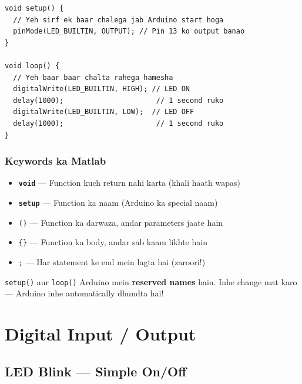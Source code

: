 \documentclass[12pt,a4paper]{article}
\newcommand{\keyword}[1]{\textcolor{keywordColor}{\texttt{\textbf{#1}}}}
\begin{document}
\begin{tcolorbox}[codebox=Ek Basic Arduino Program]
\begin{lstlisting}
void setup() {
  // Yeh sirf ek baar chalega jab Arduino start hoga
  pinMode(LED_BUILTIN, OUTPUT); // Pin 13 ko output banao
}

void loop() {
  // Yeh baar baar chalta rahega hamesha
  digitalWrite(LED_BUILTIN, HIGH); // LED ON
  delay(1000);                      // 1 second ruko
  digitalWrite(LED_BUILTIN, LOW);  // LED OFF
  delay(1000);                      // 1 second ruko
}
\end{lstlisting}
\end{tcolorbox}

\subsubsection{Keywords ka Matlab}

\begin{itemize}[leftmargin=*]
  \item \keyword{void} — Function kuch return nahi karta (khali haath wapas)
  \item \keyword{setup} — Function ka naam (Arduino ka special naam)
  \item \texttt{()} — Function ka darwaza, andar parameters jaate hain
  \item \texttt{\{\}} — Function ka body, andar sab kaam likhte hain
  \item \texttt{;} — Har statement ke end mein lagta hai (zaroori!)
\end{itemize}

\begin{tcolorbox}[notebox]
\texttt{setup()} aur \texttt{loop()} Arduino mein \textbf{reserved names} hain. Inhe change mat karo — Arduino inhe automatically dhundta hai!
\end{tcolorbox}

\newpage

\section{Digital Input / Output}

\subsection{LED Blink — Simple On/Off}
\end{document}
